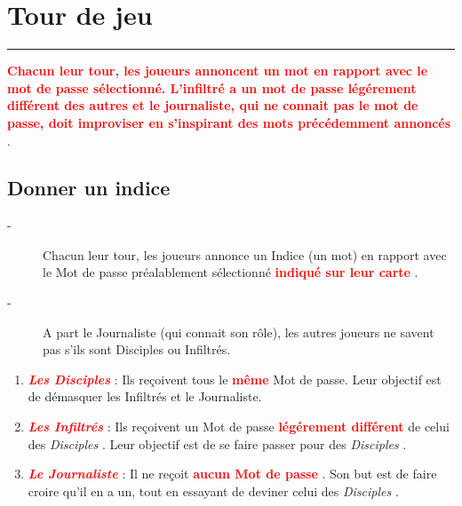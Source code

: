 \documentclass{article}%
\begin{document}
%
\sectionfont{\color{red}}%
\subsectionfont{\color{red}}%
\subsubsectionfont{\color{red}}%
\section{ Tour de jeu
}%
\label{sec:Tourdejeu}%
\textcolor{red}{\rule{18cm}{0.07cm}}\break%
\textcolor{red}{%
\textbf{Chacun leur tour, les joueurs annoncent un mot en rapport avec le mot de passe sélectionné. L'infiltré a un mot de passe légérement différent des autres et le journaliste, qui ne connait pas le mot de passe, doit improviser en s'inspirant des mots précédemment annoncés}%
}%
.


%
\subsection{ Donner un indice
}%
\label{subsec:Donnerunindice}%
\begin{description}%
\item[{-} ]%
%
 Chacun leur tour, les joueurs annonce un Indice (un mot) en rapport avec le Mot de passe préalablement sélectionné %
\textcolor{red}{%
\textbf{indiqué sur leur carte}%
}%
.
%
\item[{-} ]%
%
 A part le Journaliste (qui connait son rôle), les autres joueurs ne savent pas s'ils sont Disciples ou Infiltrés.
%
\end{description}%
\begin{enumerate}%
\item%
%
\textcolor{red}{\textbf{\textit{Les Disciples}}}%
\textit{ }%
 : Ils reçoivent tous le %
\textcolor{red}{%
\textbf{même}%
}%
\textit{ }%
 Mot de passe. Leur objectif est de démasquer les Infiltrés et le Journaliste.
%
\item%
%
\textcolor{red}{\textbf{\textit{Les Infiltrés}}}%
\textit{ }%
 : Ils reçoivent un Mot de passe %
\textcolor{red}{%
\textbf{légérement différent}%
}%
\textit{ }%
 de celui des %
\textit{Disciples}%
. Leur objectif est de se faire passer pour des %
\textit{Disciples}%
.
%
\item%
%
\textcolor{red}{\textbf{\textit{Le Journaliste}}}%
\textit{ }%
 : Il ne reçoit %
\textcolor{red}{%
\textbf{aucun Mot de passe}%
}%
. Son but est de faire croire qu'il en a un, tout en essayant de deviner celui des %
\textit{Disciples}%
.
%
\end{enumerate}

%
\end{document}
